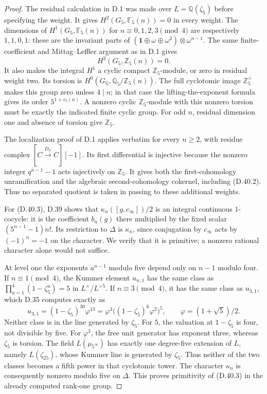 \begin{proof}
The residual calculation in D.1 was made over
\(L=\mathbb Q(\zeta_5)\) before specifying the weight.
It gives \(H^2(G_5,\mathbb F_5(n))=0\) in every weight.
The dimensions of \(H^1(G_5,\mathbb F_5(n))\) for
\(n\equiv0,1,2,3\pmod4\) are respectively \(1,1,0,1\):
these are the invariant parts of
\((\mathbf1\oplus\omega\oplus\omega^2)\otimes\omega^{n-1}\).
The same finite-coefficient and Mittag--Leffler argument
as in D.1 gives
\[
 H^2(G_5,\mathbb Z_5(n))=0.
\]
It also makes the integral \(H^1\) a cyclic compact
\(\mathbb Z_5\)-module, or zero in residual weight two.
Its torsion is
\(H^0(G_{\mathbb Q},\mathbb Q_5/\mathbb Z_5(n))\).
The full cyclotomic image \(\mathbb Z_5^\times\) makes
this group zero unless \(4\mid n\); in that case the
lifting-the-exponent formula gives its order
\(5^{1+v_5(n)}\). A nonzero cyclic \(\mathbb Z_5\)-module
with this nonzero torsion must be exactly the indicated
finite cyclic group. For odd \(n\), residual dimension
one and absence of torsion give \(\mathbb Z_5\).

The localization proof of D.1 applies verbatim for
every \(n\ge2\), with residue complex
\([C\xrightarrow{D_n}C][-1]\).
Its first differential is injective because the nonzero
integer \(q^{n-1}-1\) acts injectively on \(\mathbb Z_5\).
It gives both the first-cohomology unramification and
the algebraic second-cohomology cokernel, including
(D.40.2). Thus no separated quotient is taken in
passing to these additional weights.

For (D.40.3), D.39 shows that
\(\kappa_n([g,c_\infty])/2\) is an integral continuous
\(1\)-cocycle: it is the coefficient \(b_n(g)\) there
multiplied by the fixed scalar
\((5^{n-1}-1)n!\). Its restriction to \(\Delta\) is
\(\kappa_n\), since conjugation by \(c_\infty\) acts
by \((-1)^n=-1\) on the character.
We verify that it is primitive; a nonzero rational
character alone would not suffice.

At level one the exponents \(a^{n-1}\) modulo five
depend only on \(n-1\) modulo four. If \(n\equiv1\pmod4\),
the Kummer element \(u_{n,1}\) has the same class as
\(\prod_{a=1}^4(1-\zeta_5^a)=5\) in \(L^\times/L^{\times5}\).
If \(n\equiv3\pmod4\), it has the same class as \(u_{3,1}\),
which D.35 computes exactly as
\[
 u_{3,1}=(1-\zeta_5)^{30}\varphi^{13}
         =\varphi^3\bigl((1-\zeta_5)^6\varphi^2\bigr)^5,
 \qquad \varphi=(1+\sqrt5)/2.
\]
Neither class is in the line generated by \(\zeta_5\).
For \(5\), the valuation at \(1-\zeta_5\) is four,
not divisible by five. For \(\varphi^3\), the free
unit generator has exponent three, whereas \(\zeta_5\)
is torsion. The field \(L(\mu_{5^\infty})\) has exactly
one degree-five extension of \(L\), namely
\(L(\zeta_{25})\), whose Kummer line is generated
by \(\zeta_5\). Thus neither of the two classes
becomes a fifth power in that cyclotomic tower.
The character \(\kappa_n\) is consequently nonzero
modulo five on \(\Delta\). This proves primitivity
of (D.40.3) in the already computed rank-one group.


\end{proof}
